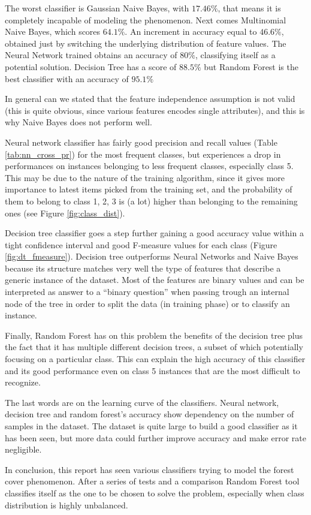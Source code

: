 \documentclass[a4paper, 10pt]{article}
\begin{document}
The worst classifier is Gaussian Naive Bayes, with $17.46\%$, that means it is completely incapable of modeling the phenomenon. Next comes Multinomial Naive Bayes, which scores $64.1\%$. An increment in accuracy equal to $46.6\%$, obtained just by switching the underlying distribution of feature values. The Neural Network trained obtains an accuracy of $80\%$, classifying itself as  
a potential solution. Decision Tree has a score of $88.5\%$ but Random Forest is the best classifier with an accuracy of $95.1\%$

In general can we stated that the feature independence assumption is not valid (this is quite obvious, since various features encodes single attributes), and this is why Naive Bayes does not perform well.

Neural network classifier has fairly good precision and recall values (Table \ref{tab:nn_cross_pr}) for the most frequent classes, but experiences a drop in performances on instances belonging to less frequent classes, especially class 5. This may be due to the nature of the training algorithm, since it gives more importance to latest items picked from the training set, and the probability of them to belong to class 1, 2, 3 is (a lot) higher than belonging to the remaining ones (see Figure \ref{fig:class_dist}). 

Decision tree classifier goes a step further gaining a good accuracy value within a tight confidence interval and good F-measure values for each class (Figure \ref{fig:dt_fmeasure}). Decision tree outperforms Neural Networks and Naive Bayes because its structure matches very well the type of features that describe a generic instance of the dataset. Most of the features are binary values and can be interpreted as answer to a ``binary question'' when passing trough an internal node of the tree in order to split the data (in training phase) or to classify an instance.

Finally, Random Forest has on this problem the benefits of the decision tree plus the fact that it has multiple different decision trees, a subset of which potentially focusing on a particular class. This can explain the high accuracy of this classifier and its good performance even on class 5 instances that are the most difficult to recognize.

The last words are on the learning curve of the classifiers. Neural network, decision tree and random forest's accuracy show dependency on the number of samples in the dataset. The dataset is quite large to build a good classifier as it has been seen, but more data could further improve accuracy and make error rate negligible.

In conclusion, this report has seen various classifiers trying to model the forest cover phenomenon. After a series of tests and a comparison Random Forest tool classifies itself as the one to be chosen to solve the problem, especially when class distribution is highly unbalanced.
\end{document}
